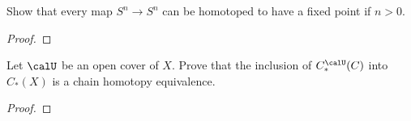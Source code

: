 \begin{problem}[Hatcher {\S}2.2, Ex.\@ 6]
Show that every map $S^n\to S^n$ can be homotoped to have a fixed point
if $n>0$.
\end{problem}
\begin{proof}
\end{proof}
\newpage

\begin{problem}
Let $\calU$ be an open cover of $X$. Prove that the inclusion of
$C_*^{\calU}(C)$ into $C_*(X)$ is a chain homotopy equivalence.
\end{problem}
\begin{proof}
\end{proof}

